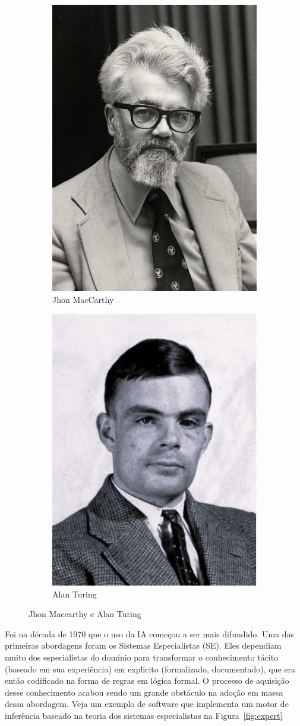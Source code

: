 \documentclass[a4paper,12pt]{book}
\begin{document}
\begin{figure}[h]
    \centering
    \begin{subfigure}[b]{0.45\textwidth}
        \centering
        \includegraphics[width=0.5\linewidth]{figuras/jhon_macharthy}
		\caption{Jhon MacCarthy}
        \label{fig:image1}
    \end{subfigure}
    \hfill
    \begin{subfigure}[b]{0.45\textwidth}
        \centering
		\includegraphics[width=0.5\linewidth]{figuras/alan_turing.png}
        \caption{Alan Turing}
        \label{fig:image2}
    \end{subfigure}
    \caption{Jhon Maccarthy e Alan Turing}
    \label{fig:figures}
\end{figure}

Foi na década de 1970 que o uso da IA começou a ser mais difundido. Uma das primeiras abordagens foram os Sistemas Especialistas (SE). Eles dependiam muito dos especialistas do domínio para transformar o conhecimento tácito (baseado em sua experiência) em explicito (formalizado, documentado), que era então codificado na forma de regras em lógica formal. O processo de aquisição desse conhecimento acabou sendo um grande obstáculo na adoção em massa dessa abordagem. Veja um exemplo de software que implementa um motor de inferência baseado na teoria dos sistemas especialistas na Figura~\ref{fig:expert}
\end{document}
